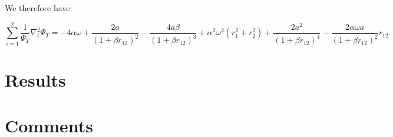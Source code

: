\documentclass[english, a4paper]{article}
\begin{document}
We therefore have:

\begin{equation}
	\sum_{i=1}^2\frac{1}{\Psi_T}\nabla_i^2\Psi_T = -4\alpha\omega + \frac{2a}{(1+\beta r_{12})^2} - \frac{4a\beta}{(1+\beta r_{12})^3} + \alpha^2\omega^2(r_1^2 + r_2^2) + \frac{2a^2}{(1+\beta r_{12})^4} - \frac{2\alpha\omega a}{(1+\beta r_{12})^2}r_{12}
\end{equation}



\subsection{}

\section{Results}


\section{Comments}
\end{document}
